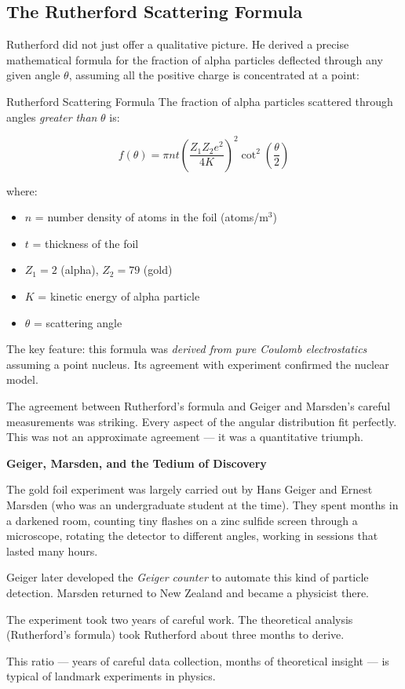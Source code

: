 \documentclass[12pt, a4paper]{book}
\theoremstyle{definition}
\begin{document}
\subsection{The Rutherford Scattering Formula}

Rutherford did not just offer a qualitative picture.
He derived a precise mathematical formula for the fraction
of alpha particles deflected through any given angle $\theta$,
assuming all the positive charge is concentrated at a point:

\begin{namedconcept}{Rutherford Scattering Formula}
The fraction of alpha particles scattered through angles
\emph{greater than} $\theta$ is:

\[
  f(\theta) = \pi n t
  \left(\frac{Z_1 Z_2 e^2}{4K}\right)^2
  \cot^2\!\!\left(\frac{\theta}{2}\right)
\]

where:
\begin{itemize}[nosep, leftmargin=2em]
  \item $n$ = number density of atoms in the foil (atoms/m$^3$)
  \item $t$ = thickness of the foil
  \item $Z_1 = 2$ (alpha), $Z_2 = 79$ (gold)
  \item $K$ = kinetic energy of alpha particle
  \item $\theta$ = scattering angle
\end{itemize}

The key feature: this formula was \emph{derived from pure
Coulomb electrostatics} assuming a point nucleus.
Its agreement with experiment confirmed the nuclear model.
\end{namedconcept}

\vspace{0.5em}

The agreement between Rutherford's formula and Geiger and
Marsden's careful measurements was striking.
Every aspect of the angular distribution fit perfectly.
This was not an approximate agreement ---
it was a quantitative triumph.

\begin{historybox}
\textbf{Geiger, Marsden, and the Tedium of Discovery}

The gold foil experiment was largely carried out by Hans Geiger
and Ernest Marsden (who was an undergraduate student at the time).
They spent months in a darkened room, counting tiny flashes
on a zinc sulfide screen through a microscope, rotating
the detector to different angles, working in sessions that
lasted many hours.

Geiger later developed the \emph{Geiger counter} to automate
this kind of particle detection.
Marsden returned to New Zealand and became a physicist there.

The experiment took two years of careful work.
The theoretical analysis (Rutherford's formula) took
Rutherford about three months to derive.

This ratio --- years of careful data collection, months of
theoretical insight --- is typical of landmark experiments
in physics.
\end{historybox}
\end{document}
